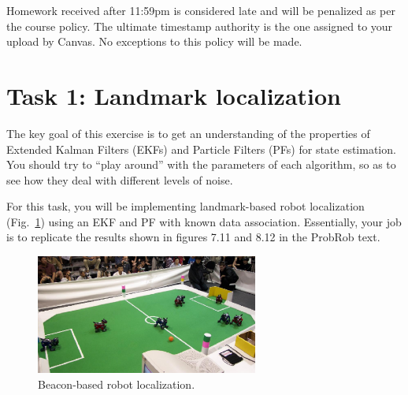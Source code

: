 \documentclass[11pt, oneside, letterpaper]{article}
\providecommand{\figref}[1]{Fig.~\ref{#1}}
\begin{document}
Homework received after 11:59pm is considered late and will be penalized as per the course policy. The ultimate timestamp authority is the one assigned to your upload by Canvas.  No exceptions to this policy will be made.


\section*{Task 1: Landmark localization}

The key goal of this exercise is to get an understanding of the properties of Extended Kalman Filters (EKFs) and Particle Filters (PFs) for state estimation. You should try to ``play around'' with the parameters of each algorithm, so as to see how they deal with different levels of noise.

For this task, you will be implementing landmark-based robot localization (\figref{F:robosoccer}) using an EKF and PF with known data association. Essentially, your job is to replicate the results shown in figures 7.11 and 8.12 in the ProbRob text.
\begin{figure}[h]%
  \centering%
  \includegraphics[width=0.65\textwidth]{./figures/specs/robosoccer.png}%
  \caption{Beacon-based robot localization.}%
  \label{F:robosoccer}%
\end{figure}
\end{document}
